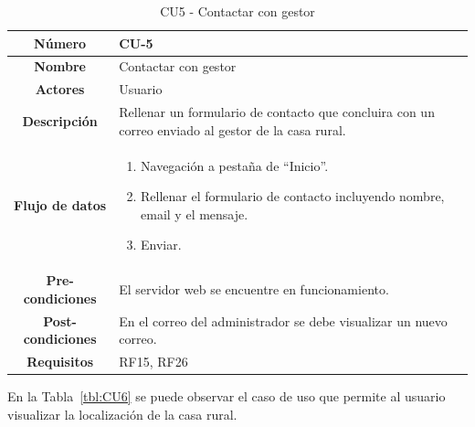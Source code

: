 \begin{table}[h!tb]
	\centering
	\begin{adjustbox}{width=1\textwidth}
	\begin{tabular}{|c|p{\textwidth}|}
		\hline {\bf Número} & CU-5 \\
		\hline {\bf Nombre} & Contactar con gestor\\
		\hline {\bf Actores} & Usuario \\
		\hline {\bf Descripción} & Rellenar un formulario de contacto que concluira con un correo enviado al gestor de la casa rural. \\
		\hline {\bf Flujo de datos}
		& 
		\begin{enumerate}
			\item Navegación a pestaña de ``Inicio''.
            \item Rellenar el formulario de contacto incluyendo nombre, email y el mensaje.
            \item Enviar.
   
        \end{enumerate}\\
		\hline {\bf Pre-condiciones}
		& El servidor web se encuentre en funcionamiento. \\
		\hline {\bf Post-condiciones}
		& En el correo del administrador se debe visualizar un nuevo correo. \\
    
		\hline {\bf Requisitos} & RF15, RF26 \\
		\hline 
	\end{tabular}
	\end{adjustbox}
	\caption{CU5 - Contactar con gestor\label{tbl:CU5}}
\end{table}
En la Tabla~\ref{tbl:CU6} se puede observar el caso de uso que permite al usuario visualizar la localización de la casa rural.
